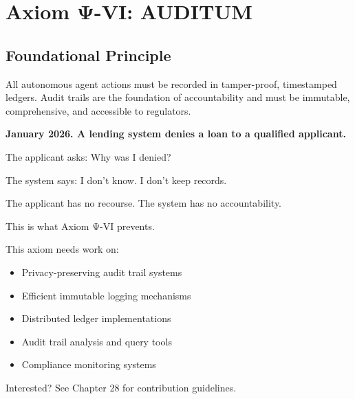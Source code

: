 
\chapter{Axiom Ψ-VI: AUDITUM}
\label{ch:axiom-VI}

\section*{Foundational Principle}

\begin{principlebox}
All autonomous agent actions must be recorded in tamper-proof, timestamped ledgers. Audit trails are the foundation of accountability and must be immutable, comprehensive, and accessible to regulators.
\end{principlebox}

\vspace{0.5cm}

\begin{tcolorbox}[colback=lightgray, colframe=legislativeblue, title=\textbf{📖 Why This Axiom Matters}]
\textbf{January 2026. A lending system denies a loan to a qualified applicant.}

The applicant asks: Why was I denied?

The system says: I don't know. I don't keep records.

The applicant has no recourse. The system has no accountability.

This is what Axiom Ψ-VI prevents.
\end{tcolorbox}

\vspace{0.5cm}

\begin{tcolorbox}[colback=lightgray, colframe=accentgold, title=\textbf{🎯 Contribution Opportunity}]
This axiom needs work on:
\begin{itemize}
    \item Privacy-preserving audit trail systems
    \item Efficient immutable logging mechanisms
    \item Distributed ledger implementations
    \item Audit trail analysis and query tools
    \item Compliance monitoring systems
\end{itemize}

Interested? See Chapter 28 for contribution guidelines.
\end{tcolorbox}

